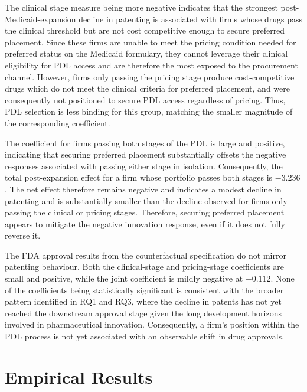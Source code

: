 \documentclass[12pt]{article}
\begin{document}
The clinical stage measure being more negative indicates that the strongest post-Medicaid-expansion decline in patenting is associated with firms whose drugs pass the clinical threshold but are not cost competitive enough to secure preferred placement. Since these firms are unable to meet the pricing condition needed for preferred status on the Medicaid formulary, they cannot leverage their clinical eligibility for PDL access and are therefore the most exposed to the procurement channel. However, firms only passing the pricing stage produce cost-competitive drugs which do not meet the clinical criteria for preferred placement, and were consequently not positioned to secure PDL access regardless of pricing. Thus, PDL selection is less binding for this group, matching the smaller magnitude of the corresponding coefficient.

The coefficient for firms passing both stages of the PDL is large and positive, indicating that securing preferred placement substantially offsets the negative responses associated with passing either stage in isolation. Consequently, the total post-expansion effect for a firm whose portfolio passes both stages is $-3.236$. The net effect therefore remains negative and indicates a modest decline in patenting and is substantially smaller than the decline observed for firms only passing the clinical or pricing stages. Therefore, securing preferred placement appears to mitigate the negative innovation response, even if it does not fully reverse it.

The FDA approval results from the counterfactual specification do not mirror patenting behaviour. Both the clinical-stage and pricing-stage coefficients are small and positive, while the joint coefficient is mildly negative at $-0.112$. None of the coefficients being statistically significant is consistent with the broader pattern identified in RQ1 and RQ3, where the decline in patents has not yet reached the downstream approval stage given the long development horizons involved in pharmaceutical innovation. Consequently, a firm's position within the PDL process is not yet associated with an observable shift in drug approvals.

\clearpage




\ifdefined\isdraft\else

\clearpage
\appendix

\section{Empirical Results}
\end{document}
